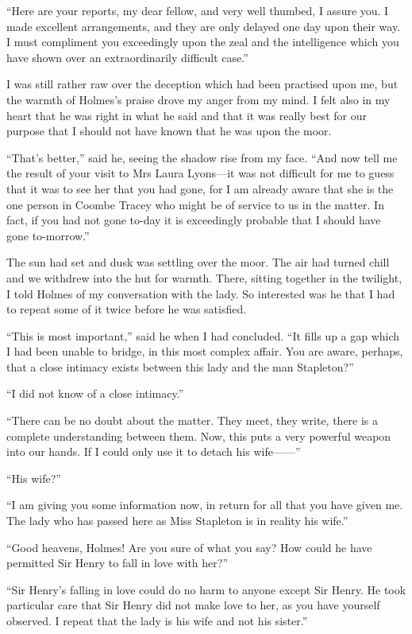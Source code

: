 \documentclass[paper=5.5in:8.5in,BCOR=7mm,twoside,DIV=calc,12pt,usegeometry,openany,chapterprefix,endperiod]{scrbook} %
\begin{document}
\enquote{Here are your reports, my dear fellow, and very well thumbed, I assure you. I made excellent arrangements, and they are only delayed one day upon their way. I must compliment you exceedingly upon the zeal and the intelligence which you have shown over an extraordinarily difficult case.}

I was still rather raw over the deception which had been practised upon me, but the warmth of Holmes's praise drove my anger from my mind. I felt also in my heart that he was right in what he said and that it was really best for our purpose that I should not have known that he was upon the moor.

\enquote{That's better,} said he, seeing the shadow rise from my face. \enquote{And now tell me the result of your visit to Mrs Laura Lyons\nobreakdash---it was not difficult for me to guess that it was to see her that you had gone, for I am already aware that she is the one person in Coombe Tracey who might be of service to us in the matter. In fact, if you had not gone to-day it is exceedingly probable that I should have gone to-morrow.}

The sun had set and dusk was settling over the moor. The air had turned chill and we withdrew into the hut for warmth. There, sitting together in the twilight, I told Holmes of my conversation with the lady. So interested was he that I had to repeat some of it twice before he was satisfied.

\enquote{This is most important,} said he when I had concluded. \enquote{It fills up a gap which I had been unable to bridge, in this most complex affair. You are aware, perhaps, that a close intimacy exists between this lady and the man Stapleton?}

\enquote{I did not know of a close intimacy.}

\enquote{There can be no doubt about the matter. They meet, they write, there is a complete understanding between them. Now, this puts a very powerful weapon into our hands. If I could only use it to detach his wife\nobreakdash---\nobreakdash---}

\enquote{His wife?}

\enquote{I am giving you some information now, in return for all that you have given me. The lady who has passed here as Miss Stapleton is in reality his wife.}

\enquote{Good heavens, Holmes! Are you sure of what you say? How could he have permitted Sir Henry to fall in love with her?}

\enquote{Sir Henry's falling in love could do no harm to anyone except Sir Henry. He took particular care that Sir Henry did not make love to her, as you have yourself observed. I repeat that the lady is his wife and not his sister.}
\end{document}
